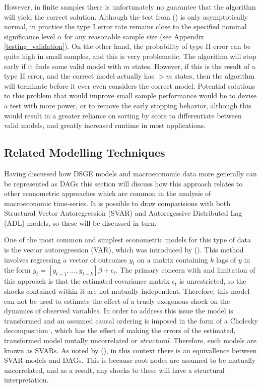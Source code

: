 \documentclass{article}
\begin{document}
However, in finite samples there is unfortunately no guarantee that the algorithm will yield the correct solution. Although the test from \citeauthor{srivastava2005some} (\citeyear{srivastava2005some}) is only asymptotically normal, in practice the type I error rate remains close to the specified nominal significance level $\alpha$ for any reasonable sample size (see Appendix \ref{testing_validation}). On the other hand, the probability of type II error can be quite high in small samples, and this is very problematic. The algorithm will stop early if it finds some valid model with $m$ states. However, if this is the result of a type II error, and the correct model actually has $>m$ states, then the algorithm will terminate before it ever even considers the correct model. Potential solutions to this problem that would improve small sample performance would be to devise a test with more power, or to remove the early stopping behavior, although this would result in a greater reliance on sorting by score to differentiate between valid models, and greatly increased runtime in most applications.

\subsection{Related Modelling Techniques}

Having discussed how DSGE models and macroeconomic data more generally can be represented as DAGs this section will discuss how this approach relates to other econometric approaches which are common in the analysis of macroeconomic time-series. It is possible to draw comparisions with both Structural Vector Autoregression (SVAR) and Autoregessive Distributed Lag (ADL) models, so these will be discussed in turn.

One of the most common and simplest econometric models for this type of data is the vector autoregression (VAR), which was introduced by \citeauthor{sims1980macroeconomics} (\citeyear{sims1980macroeconomics}). This method involves regressing a vector of outcomes $y_t$ on a matrix containing $k$ lags of $y$ in the form $y_t = [y_{t-1}, ..., y_{t-k}] \beta + \epsilon_t $. The primary concern with and limitation of this approach is that the estimated covariance matrix $\epsilon_t$ is unrestricted, so the shocks contained within it are not mutually independent. Therefore, this model can not be used to estimate the effect of a truely exogenous shock on the dynamics of observed variables. In order to address this issue the model is transformed and an assumed causal ordering is imposed in the form of a Cholesky decomposition \parencite{sims1980macroeconomics}, which has the effect of making the errors of the estimated, transformed model mutally uncorrelated or \textit{structural}. Therefore, such models are known as SVARs. As noted by \citeauthor{demiralp2003searching} (\citeyear{demiralp2003searching}), in this context there is an equivallence between SVAR models and DAGs. This is because root nodes are assumed to be mutually uncorrelated, and as a result, any shocks to these will have a structural interpretation.
\end{document}
